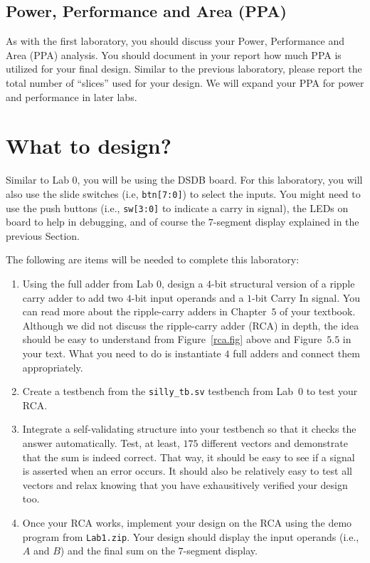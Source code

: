 \documentclass{article}
\begin{document}
\subsection{Power, Performance and Area (PPA)}

As with the first laboratory, you should discuss your
Power, Performance and Area (PPA)
analysis.  You should document in your report how much PPA is utilized
for your final design.  Similar to the previous laboratory, please report
the total number of ``slices'' used for your design.  We will expand
your PPA for power and performance in later labs.

\section{What to design?}

Similar to Lab 0, you will be using the DSDB board.
For this laboratory, you will also use the slide switches (i.e,
\verb!btn[7:0]!) to select the
inputs.  You might need to use the push buttons (i.e., \verb!sw[3:0]!
to indicate a carry in signal), the LEDs on board to help in
debugging, and of course the $7$-segment display
explained in the previous Section.

The following are items will be needed to complete this laboratory:
\begin{enumerate}
  \item Using the full adder from Lab 0, design a $4$-bit structural
    version of a ripple carry
    adder to add two $4$-bit input operands and a $1$-bit Carry In
    signal.  You can read more about the ripple-carry adders in
    Chapter~$5$ of your textbook.  Although we did not discuss the
    ripple-carry adder (RCA) in depth,
    the idea should be easy to understand from
    Figure~\ref{rca.fig} above and Figure~$5.5$ in your text.  What
    you need to do is instantiate $4$ full adders and connect them
    appropriately.  
    \item Create a testbench from the \verb!silly_tb.sv! testbench from
      Lab~$0$ to test your RCA.  
    \item Integrate a self-validating structure into your testbench so
      that it checks the answer automatically.  Test, at least, $175$
      different vectors and demonstrate that the sum is indeed
      correct.  That way, it
      should be easy to see if a signal is asserted when an error
      occurs.
      It should also be relatively easy to test all vectors and
      relax knowing that you have exhausitively verified your design too.
    \item Once your RCA works, implement your design on the RCA
      using the demo program from \verb!Lab1.zip!.  Your design should
      display the input operands (i.e., $A$ and $B$) and the final
      sum on the $7$-segment display.
\end{enumerate}
\end{document}
